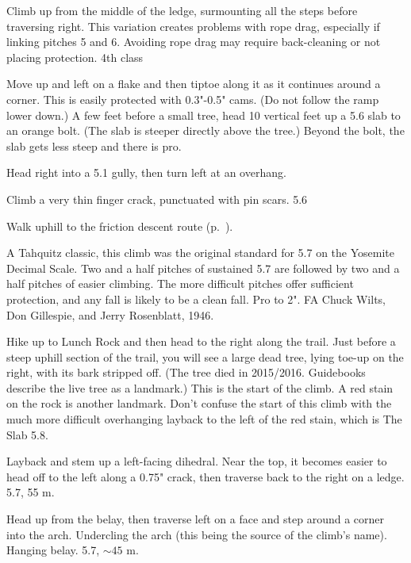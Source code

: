 \documentclass{tahquitz}
\begin{document}
 Climb up from the middle of the ledge, surmounting all the steps
before traversing right. This variation creates problems with rope drag, especially
if linking pitches 5 and 6. Avoiding rope drag may require back-cleaning or not
placing protection. 4th class

 Move up and left on a flake and then tiptoe along it as it
continues around a corner.  This is easily protected with 0.3"-0.5"
cams. (Do not follow the ramp lower down.)  A few feet before a small
tree, head 10 vertical feet up a 5.6 slab to an orange bolt. (The slab is steeper
directly above the tree.) Beyond the bolt, the slab gets less steep
and there is pro. 

 Head right into a 5.1 gully, then turn left at an overhang.

 Climb a very thin finger crack, punctuated with pin scars. 5.6

Walk uphill to the friction descent route  (p.~\pageref{subsec:friction-descent}).




A Tahquitz classic, this climb was the original standard for 5.7 on the Yosemite Decimal
Scale. Two and a half pitches of sustained 5.7 are followed by two and a half pitches
of easier climbing. The more difficult pitches offer sufficient protection, and any fall
is likely to be a clean fall. Pro to 2".
FA Chuck Wilts, Don Gillespie, and Jerry Rosenblatt, 1946.

Hike up to Lunch Rock and then head to the right along the
trail. Just before a steep uphill section of the trail, you
will see a large dead tree, lying toe-up on the right, with its
bark stripped off. (The tree died in 2015/2016.
Guidebooks describe the live tree as a landmark.) This
is the start of the climb. A red stain on the rock is another
landmark. Don't confuse the start of this climb with the much more
difficult overhanging layback to the left of the red stain,
which is The Slab 5.8.

 Layback and stem up a left-facing dihedral. Near the top, it becomes easier to
head off to the left along a 0.75" crack, then traverse back to the right
on a ledge. 5.7, 55 m.

 Head up from the belay, then traverse left on a face and
step around a corner into the arch. Undercling the arch (this being
the source of the climb's name). Hanging belay. 5.7, $\sim45$ m.
\end{document}
